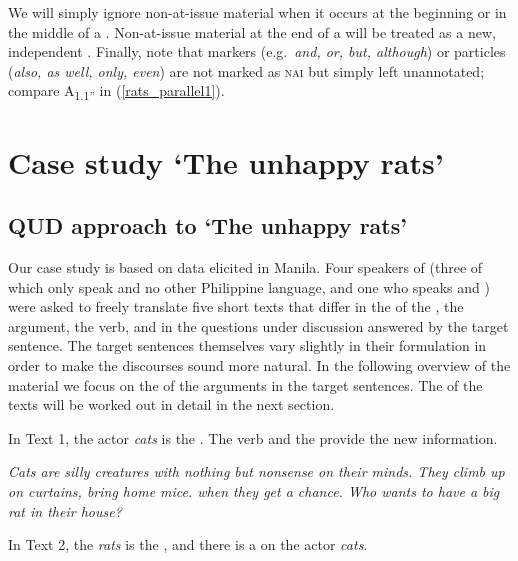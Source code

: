 \documentclass[output=paper,
,modfonts
,nonflat]{langsci/langscibook}
\begin{document}
\noindent We will simply ignore non-at-issue material when it occurs at the beginning or in the middle of a .  Non-at-issue material at the end of a  will be treated as a new, independent . Finally, note that  markers (e.g.\ \textit{and, or, but, although}) or  particles (\textit{also, as well, only, even}) are not marked as \textsc{nai} but simply left unannotated; compare A\textsubscript{{1.1''}} in (\ref{rats_parallel1}).

\section{Case study `The unhappy rats’}\label{sect:rats}

\subsection{QUD approach to `The unhappy rats’}\label{sect:rats_texte}

Our case study is based on data elicited in Manila. Four speakers of  (three of which only speak  and no other Philippine language, and one who speaks  and ) were asked to freely translate five short texts that differ in the  of the , the  argument, the verb, and in the questions under discussion answered by the target sentence. The target sentences themselves vary slightly in their formulation in order to make the discourses sound more natural. In the following overview of the material we focus on the  of the arguments in the target sentences. The  of the texts will be worked out in detail in the next section.

In Text 1, the actor \textit{cats} is the . The verb and the  provide the new information.

\begin{exe}
\textit{Cats are silly creatures with nothing but nonsense on their minds. They climb up on curtains, bring home mice.  when they get a chance. Who wants to have a big rat in their house?}
\end{exe}

\noindent In Text 2, the  \textit{rats} is the , and there is a  on the actor \textit{cats}.
\end{document}
